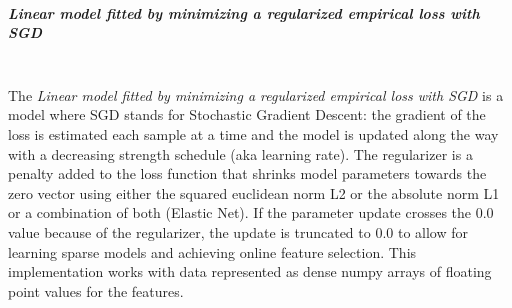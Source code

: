 \subparagraph{Linear model fitted by minimizing a regularized empirical loss
with SGD}
\mbox{}
\\The \textit{Linear model fitted by minimizing a regularized empirical loss
with SGD} is a model where SGD stands for Stochastic Gradient Descent: the
gradient of the loss is estimated each sample at a time and the model is updated
along the way with a decreasing strength schedule (aka learning rate).
%
The regularizer is a penalty added to the loss function that shrinks model
parameters towards the zero vector using either the squared euclidean norm L2 or
the absolute norm L1 or a combination of both (Elastic Net).
%
If the parameter update crosses the 0.0 value because of the regularizer, the
update is truncated to 0.0 to allow for learning sparse models and achieving
online feature selection.
%
This implementation works with data represented as dense numpy arrays of
floating point values for the features.
%
